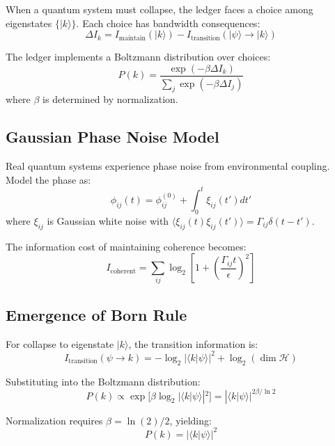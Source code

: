 \documentclass[twocolumn,prd,amsmath,amssymb,aps,superscriptaddress,nofootinbib]{revtex4-2}
\begin{document}
When a quantum system must collapse, the ledger faces a choice among eigenstates $\{|k\rangle\}$. Each choice has bandwidth consequences:
\begin{equation}
\Delta I_k = I_{\text{maintain}}(|k\rangle) - I_{\text{transition}}(|\psi\rangle \rightarrow |k\rangle)
\end{equation}

The ledger implements a Boltzmann distribution over choices:
\begin{equation}
P(k) = \frac{\exp(-\beta \Delta I_k)}{\sum_j \exp(-\beta \Delta I_j)}
\label{eq:boltzmann}
\end{equation}
where $\beta$ is determined by normalization.

\subsection{Gaussian Phase Noise Model}

Real quantum systems experience phase noise from environmental coupling. Model the phase as:
\begin{equation}
\phi_{ij}(t) = \phi_{ij}^{(0)} + \int_0^t \xi_{ij}(t') dt'
\end{equation}
where $\xi_{ij}$ is Gaussian white noise with $\langle\xi_{ij}(t)\xi_{ij}(t')\rangle = \Gamma_{ij} \delta(t-t')$.

The information cost of maintaining coherence becomes:
\begin{equation}
I_{\text{coherent}} = \sum_{ij} \log_2\left[1 + \left(\frac{\Gamma_{ij} t}{\epsilon}\right)^2\right]
\end{equation}

\subsection{Emergence of Born Rule}

For collapse to eigenstate $|k\rangle$, the transition information is:
\begin{equation}
I_{\text{transition}}(\psi \rightarrow k) = -\log_2|\langle k|\psi\rangle|^2 + \log_2(\dim \mathcal{H})
\end{equation}

Substituting into the Boltzmann distribution:
\begin{equation}
P(k) \propto \exp[\beta \log_2|\langle k|\psi\rangle|^2] = |\langle k|\psi\rangle|^{2\beta/\ln 2}
\end{equation}

Normalization requires $\beta = \ln(2)/2$, yielding:
\begin{equation}
\boxed{P(k) = |\langle k|\psi\rangle|^2}
\label{eq:born_rule}
\end{equation}
\end{document}

